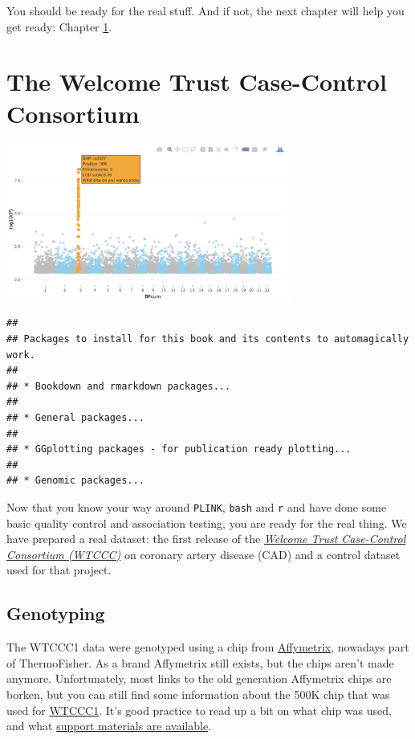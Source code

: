 \documentclass[
]{book}
\newcommand{\passthrough}[1]{#1}
\begin{document}
You should be ready for the real stuff. And if not, the next chapter will help you get ready: Chapter \ref{wtccc1-intro}.

\hypertarget{wtccc1-intro}{%
\chapter{The Welcome Trust Case-Control Consortium}\label{wtccc1-intro}}

\includegraphics[width=0.7\textwidth,height=\textheight]{./img/_gwas/interactive_plot.png}

\begin{lstlisting}
## 
## Packages to install for this book and its contents to automagically work.
## 
## * Bookdown and rmarkdown packages...
## 
## * General packages...
## 
## * GGplotting packages - for publication ready plotting...
## 
## * Genomic packages...
\end{lstlisting}

Now that you know your way around \passthrough{\lstinline!PLINK!}, \passthrough{\lstinline!bash!} and \passthrough{\lstinline!r!} and have done some basic quality control and association testing, you are ready for the real thing. We have prepared a real dataset: the first release of the \href{https://www.wtccc.org.uk/ccc1/overview.html}{\emph{Welcome Trust Case-Control Consortium (WTCCC)}} on coronary artery disease (CAD) and a control dataset used for that project.

\hypertarget{genotyping}{%
\section{Genotyping}\label{genotyping}}

The WTCCC1 data were genotyped using a chip from \href{https://www.thermofisher.com/us/en/home/life-science/microarray-analysis/affymetrix.html?category=34000\&categoryIdClicked=34000\&rootCategoryId=34000\&navMode=34000\&aId=productsNav}{Affymetrix}, nowadays part of ThermoFisher. As a brand Affymetrix still exists, but the chips aren't made anymore. Unfortunately, most links to the old generation Affymetrix chips are borken, but you can still find some information about the 500K chip that was used for \href{https://tools.thermofisher.com/content/sfs/brochures/whole_genome_assoc_500k_jsmith.pdf}{WTCCC1}. It's good practice to read up a bit on what chip was used, and what \href{https://www.thermofisher.com/us/en/home/life-science/microarray-analysis/microarray-data-analysis.html}{support materials are available}.
\end{document}
